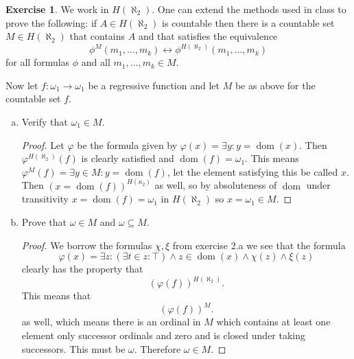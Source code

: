 \documentclass{article}
\theoremstyle{definition}
\newtheorem{question}{Exercise}
\DeclareMathOperator{\dom}{dom}
\begin{document}
\begin{question}
    We work in \(H(\aleph_{2})\). One can extend the methods used in class to
    prove the following: if \(A\in H(\aleph_{2})\) is countable then there is a
    countable set \(M\in H(\aleph_{2})\) that contains \(A\) and that satisfies
    the equivalence
    \[
        \phi^{M}(m_{1},\ldots,m_{k})\leftrightarrow\phi^{H(\aleph_{2})}(m_{1},\ldots,m_{k})
    \]
    for all formulas \(\phi\) and all \(m_{1},\ldots,m_{k}\in M\).

    Now let \(f:\omega_{1}\to\omega_{1}\) be a regressive function and let \(M\)
    be as above for the countable set \(f\).
    \begin{enumerate}[a.]
        \item Verify that \(\omega_{1}\in M\).

              \begin{proof}
                  Let \(\varphi\) be the formula given by \(\varphi(x)=\exists
                  y:y=\dom(x)\). Then \(\varphi^{H(\aleph_{2})}(f)\) is clearly
                  satisfied and \(\dom(f)=\omega_{1}\). This means
                  \(\varphi^{M}(f)=\exists y\in M:y=\dom(f)\), let the element
                  satisfying this be called \(x\). Then
                  \((x=\dom(f))^{H(\kappa_{2})}\) as well, so by absoluteness of
                  \(\dom\) under transitivity \(x=\dom(f)=\omega_{1}\) in
                  \(H(\aleph_{2})\) so \(x=\omega_{1}\in M\).
              \end{proof}

        \item Prove that \(\omega\in M\) and \(\omega\subseteq M\).

              \begin{proof}
                  We borrow the formulas \(\chi,\xi\) from exercise 2.a we see that
                  the formula
                  \[
                      \varphi(x)=\exists z:(\exists t\in z:\top)\wedge z\in\dom(x)\wedge\chi(z)\wedge\xi(z)
                  \]
                  clearly has the property that
                  \[
                      (\varphi(f))^{H(\aleph_{2})}.
                  \]
                  This means that
                  \[
                      (\varphi(f))^{M}.
                  \]
                  as well, which means there is an ordinal in \(M\) which
                  contains at least one element only successor ordinals and zero
                  and is closed under taking successors. This must be
                  \(\omega\). Therefore \(\omega\in M\).


\end{proof}
\end{enumerate}
\end{question}
\end{document}

